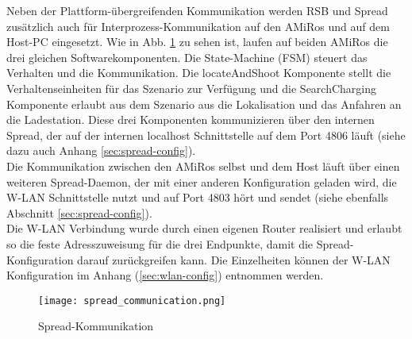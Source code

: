 Neben der Plattform-übergreifenden Kommunikation werden RSB und Spread zusätzlich auch für Interprozess-Kommunikation auf den AMiRos und auf dem Host-PC eingesetzt. Wie in Abb. \ref{fig:spread} zu sehen ist, laufen auf beiden AMiRos die drei gleichen Softwarekomponenten. Die State-Machine (FSM) steuert das Verhalten und die Kommunikation. Die locateAndShoot Komponente stellt die Verhaltenseinheiten für das Szenario zur Verfügung und die SearchCharging Komponente erlaubt aus dem Szenario aus die Lokalisation und das Anfahren an die Ladestation. Diese drei Komponenten kommunizieren über den internen Spread, der auf der internen localhost Schnittstelle auf dem Port 4806 läuft (siehe dazu auch Anhang \ref{sec:spread-config}).\\
Die Kommunikation zwischen den AMiRos selbst und dem Host läuft über einen weiteren Spread-Daemon, der mit einer anderen Konfiguration geladen wird, die W-LAN Schnittstelle nutzt und auf Port  4803 hört und sendet (siehe ebenfalls Abschnitt \ref{sec:spread-config}).\\
Die W-LAN Verbindung wurde durch einen eigenen Router realisiert und erlaubt so die feste Adresszuweisung für die drei Endpunkte, damit die Spread-Konfiguration darauf zurückgreifen kann. Die Einzelheiten können der W-LAN Konfiguration im Anhang (\ref{sec:wlan-config}) entnommen werden.
\begin{figure}[H]
	\begin{center}
		\texttt{[image: spread\_communication.png]} 	
		\caption{Spread-Kommunikation}
		\label{fig:spread}
	\end{center}
\end{figure}

